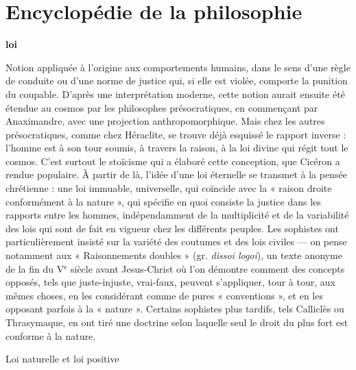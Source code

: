 
\section{Encyclopédie de la philosophie}

{\bf loi} 

\vspace{.7cm}
Notion appliquée à l’origine aux
comportements humains, dans le sens
d’une règle de conduite ou d’une norme
de justice qui, si elle est violée, comporte
la punition du coupable. D'après une
interprétation moderne, cette notion
aurait ensuite été étendue au cosmos par
les philosophes  présocratiques, en
commençant par Anaximandre, avec une
projection anthropomorphique. Mais chez
les autres présocratiques, comme chez
Héraclite, se trouve déjà esquissé le rapport inverse : l’homme est à son tour soumis, à travers la raison, à la loi divine qui
régit tout le cosmos. C’est surtout le stoïcisme qui a élaboré cette conception, que
Cicéron a rendue populaire. À partir de
là, l’idée d’une loi éternelle se transmet à
la pensée chrétienne : une loi immuable,
universelle, qui coïncide avec la « raison
droite conformément à la nature », qui
spécifie en quoi consiste la justice dans les
rapports entre les hommes, indépendamment de la multiplicité et de la variabilité
des lois qui sont de fait en vigueur chez
les différents peuples. Les sophistes ont
particulièrement insisté sur la variété des
coutumes et des lois civiles — on pense
notamment aux « Raisonnements doubles » (gr. {\it dissoi logoi}), un texte anonyme
de la fin du {\footnotesize V}$^\text{e}$ siècle avant Jesus-Christ où l’on
démontre comment des concepts opposés,
tels que juste-injuste, vrai-faux, peuvent
s'appliquer, tour à tour, aux mêmes
choses, en les considérant comme de
pures « conventions », et en les opposant
parfois à la « nature ». Certains sophistes
plus tardifs, tels Calliclès ou Thrasymaque, en ont tiré une doctrine selon
laquelle seul le droit du plus fort est
conforme à la nature.

Loi naturelle et loi positive

